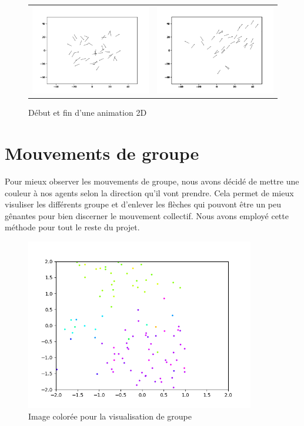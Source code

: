 \documentclass[french, a4paper, 12pt, openany]{report}
\begin{document}
   
	\begin{figure}[!h]
		\centering
		\begin{tabular}{cc}
			\includegraphics[width=8cm]{images/image_3.png} & \includegraphics[width=8cm]{images/image_4.png} \\
		\end{tabular}
		\caption{Début et fin d'une animation 2D}
	\end{figure} 
   
   
\section{Mouvements de groupe}

   Pour mieux observer les mouvements de groupe, nous avons décidé de mettre une couleur à nos agents selon la direction qu'il vont prendre. Cela permet de mieux visuliser les différents groupe et d'enlever les flèches qui pouvont être un peu gênantes pour bien discerner le mouvement collectif. Nous avons employé cette méthode pour tout le reste du projet.
   
   \begin{figure}[!h]
		\centering
		\includegraphics[width=10cm]{images/image_6.png}
		\caption{Image colorée pour la visualisation de groupe}
		\label{couleurs_image}
	\end{figure}  
   
\end{document}
